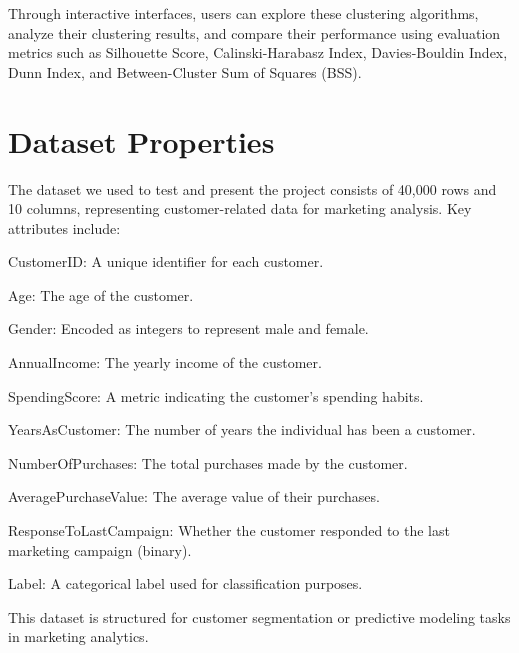 \documentclass[unnumsec,webpdf,contemporary,large]{oup-authoring-template}%
\theoremstyle{thmstyleone}%
\theoremstyle{thmstyletwo}%
\theoremstyle{thmstylethree}%
\begin{document}
Through interactive interfaces, users can explore these clustering algorithms, analyze their clustering results, and compare their performance using evaluation metrics such as Silhouette Score, Calinski-Harabasz Index, Davies-Bouldin Index, Dunn Index, and Between-Cluster Sum of Squares (BSS).
\vspace{0.2cm}

\section{Dataset Properties}

The dataset we used to test and present the project consists of 40,000 rows and 10 columns, representing customer-related data for marketing analysis. Key attributes include:
\vspace{0.2cm}

CustomerID: A unique identifier for each customer.
\vspace{0.2cm}

Age: The age of the customer.
\vspace{0.2cm}

Gender: Encoded as integers to represent male and female.
\vspace{0.2cm}

AnnualIncome: The yearly income of the customer.\vspace{0.2cm}

SpendingScore: A metric indicating the customer's spending habits.
\vspace{0.2cm}

YearsAsCustomer: The number of years the individual has been a customer.
\vspace{0.2cm}

NumberOfPurchases: The total purchases made by the customer.
\vspace{0.2cm}

AveragePurchaseValue: The average value of their purchases.
\vspace{0.2cm}

ResponseToLastCampaign: Whether the customer responded to the last marketing campaign (binary).
\vspace{0.2cm}

Label: A categorical label used for classification purposes.
\vspace{0.2cm}


This dataset is structured for customer segmentation or predictive modeling tasks in marketing analytics. 
\end{document}
